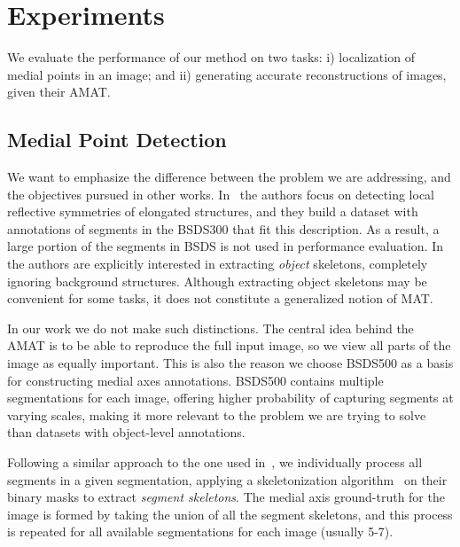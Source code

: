 \documentclass[10pt,twocolumn,letterpaper]{article}
\begin{document}
\section{Experiments}\label{sec:experiments}
We evaluate the performance of our method on two tasks: 
i) localization of medial points in an image; and
ii) generating accurate reconstructions of images, given their AMAT.

\subsection{Medial Point Detection}\label{sec:experiments:detection}
We want to emphasize the difference between the problem we are addressing, and the objectives pursued in other works.
In~\cite{tsogkas2012learning} the authors focus on detecting local reflective symmetries of elongated structures,
and they build a dataset with annotations of segments in the BSDS300 that fit this description.
As a result, a large portion of the segments in BSDS is not used in performance evaluation.
In~\cite{shen2016object} the authors are explicitly interested in extracting \emph{object}
skeletons, completely ignoring background structures.
Although extracting object skeletons may be convenient for some tasks, it does not constitute a generalized
notion of MAT.

In our work we do not make such distinctions. 
The central idea behind the AMAT is to be able to reproduce the full input image,
so we view all parts of the image as equally important.
This is also the reason we choose BSDS500 as a basis for constructing medial axes annotations.
BSDS500 contains multiple segmentations for each image, offering higher probability of
capturing segments at varying scales, making it more relevant to the problem we are trying to solve
than datasets with object-level annotations.

Following a similar approach to the one used in~\cite{tsogkas2012learning}, 
we individually process all segments in a given segmentation, applying a skeletonization 
algorithm~\cite{telea2002augmented} on their binary masks to extract \emph{segment skeletons}.
The medial axis ground-truth for the image is formed by taking the union of all the segment skeletons, and this
process is repeated for all available segmentations for each image (usually 5-7).
\end{document}
